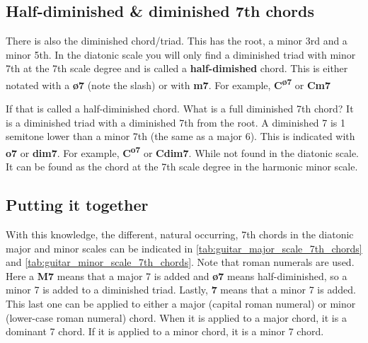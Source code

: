 
\subsection{Half-diminished \& diminished 7th chords}

There is also the diminished chord/triad. This has the root, a minor 3rd and a minor 5th. In the diatonic scale you will only find a diminished triad with minor 7th at the 7th scale degree and is called a \textbf{half-dimished} chord. This is either notated with a \textbf{\o7} (note the slash) or with \textbf{m7}. For example, \textbf{C\textsuperscript{\o7}} or \textbf{Cm7}

If that is called a half-diminished chord. What is a full diminished 7th chord? It is a diminished triad with a diminished 7th from the root. A diminished 7 is 1 semitone lower than a minor 7th (the same as a major 6). This is indicated with \textbf{o7} or \textbf{dim7}. For example, \textbf{C\textsuperscript{o7}} or \textbf{Cdim7}. While not found in the diatonic scale. It can be found as the chord at the 7th scale degree in the harmonic minor scale.

\newpage 

\subsection{Putting it together}

With this knowledge, the different, natural occurring, 7th chords in the diatonic major and minor scales can be indicated in \autoref{tab:guitar_major_scale_7th_chords} and \autoref{tab:guitar_minor_scale_7th_chords}. Note that roman numerals are used. Here a \textbf{M7} means that a major 7 is added and \textbf{\o7} means half-diminished, so a minor 7 is added to a diminished triad. Lastly, \textbf{7} means that a minor 7 is added. This last one can be applied to either a major (capital roman numeral) or minor (lower-case roman numeral) chord. When it is applied to a major chord, it is a dominant 7 chord. If it is applied to a minor chord, it is a minor 7 chord.

